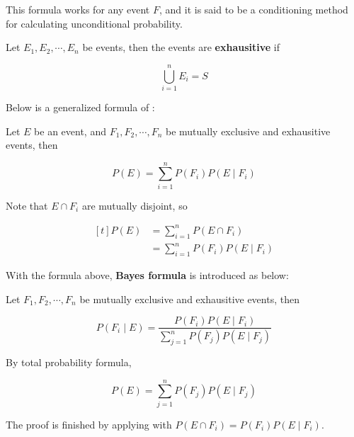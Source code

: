 \documentclass[a4paper,12pt]{article}
\begin{document}
This formula works for any event $F$, and it is said to be a conditioning method for calculating unconditional probability.\n

\begin{dft}
  Let $E_{1},E_{2},\cdots,E_{n}$ be events, then the events are \textbf{exhausitive} if

  $$\bigcup_{i=1}^{n}E_{i}=S$$
\end{dft}\n

Below is a generalized formula of \rpst[\sctr{1}]:\n

\begin{crl}
  Let $E$ be an event, and $F_{1},F_{2},\cdots,F_{n}$ be mutually exclusive and exhausitive events, then

  $$P(E)=\sum_{i=1}^{n}P(F_{i})P(E\mid F_{i})$$\s

  \prf Note that $E\cap F_{i}$ are mutually disjoint, so

  $$\begin{aligned}[t]
    P(E)&=\sum_{i=1}^{n}P(E\cap F_{i})\\
    &=\sum_{i=1}^{n}P(F_{i})P(E\mid F_{i})
  \end{aligned}$$
\end{crl}\n

With the formula above, \textbf{Bayes formula} is introduced as below:\n

\begin{thm}
  Let $F_{1},F_{2},\cdots,F_{n}$ be mutually exclusive and exhausitive events, then

  $$P(F_{i}\mid E)=\frac{P(F_{i})P(E\mid F_{i})}{\sum_{j=1}^{n}P(F_{j})P(E\mid F_{j})}$$\s

  \prf By total probability formula,

  $$P(E)=\sum_{j=1}^{n}P(F_{j})P(E\mid F_{j})$$\s

  The proof is finished by applying \rdft[\sctr{5}] with $P(E\cap F_{i})=P(F_{i})P(E\mid F_{i})$.
\end{thm}\n
\end{document}

